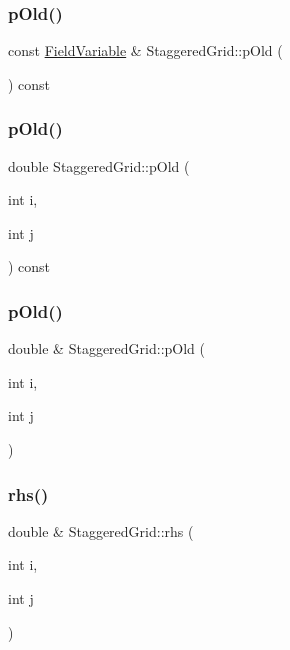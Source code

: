 \subsubsection{\texorpdfstring{pOld()}{pOld()}\hspace{0.1cm}{\footnotesize\ttfamily [1/3]}}
{\footnotesize\ttfamily const \mbox{\hyperlink{classFieldVariable}{Field\+Variable}} \& Staggered\+Grid\+::p\+Old (\begin{DoxyParamCaption}{ }\end{DoxyParamCaption}) const}

\mbox{\label{classStaggeredGrid_abf716a1e38d3c5f96b4d28fec19a35dd}} 
\subsubsection{\texorpdfstring{pOld()}{pOld()}\hspace{0.1cm}{\footnotesize\ttfamily [2/3]}}
{\footnotesize\ttfamily double Staggered\+Grid\+::p\+Old (\begin{DoxyParamCaption}\item[{int}]{i,  }\item[{int}]{j }\end{DoxyParamCaption}) const}

\mbox{\label{classStaggeredGrid_afd6f66c4e032762078b9bc518f0bf478}} 
\subsubsection{\texorpdfstring{pOld()}{pOld()}\hspace{0.1cm}{\footnotesize\ttfamily [3/3]}}
{\footnotesize\ttfamily double \& Staggered\+Grid\+::p\+Old (\begin{DoxyParamCaption}\item[{int}]{i,  }\item[{int}]{j }\end{DoxyParamCaption})}

\mbox{\label{classStaggeredGrid_a761ea51f1e8fd1290b3adfe09942b0d3}} 
\subsubsection{\texorpdfstring{rhs()}{rhs()}}
{\footnotesize\ttfamily double \& Staggered\+Grid\+::rhs (\begin{DoxyParamCaption}\item[{int}]{i,  }\item[{int}]{j }\end{DoxyParamCaption})}

